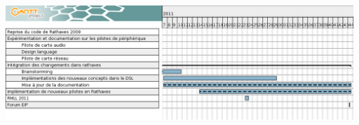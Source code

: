 \documentclass[chapterprefix=off]{rtxreport}
\begin{document}
\begin{landscape}
\begin{table}
\centering
{}
\includegraphics[scale=0.55]{../../gantt/ganttRathaxes_v2}
\end{table}
\end{landscape}

\rtxbibliography
\end{document}
